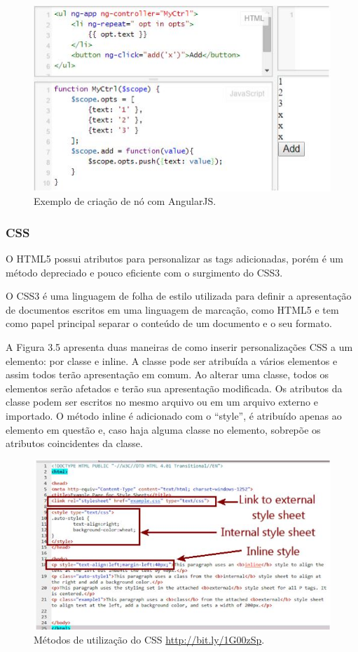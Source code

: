 \documentclass[
  12pt,				%
  openany,
  oneside,
  a4paper,			%
  english,			%
  brazil
]{article}
\numberwithin{figure}{section}
\numberwithin{table}{section}
\begin{document}
\begin{figure}[!htb]
\centering
\includegraphics[width=1\textwidth]{figura34}
\caption{Exemplo de criação de nó com AngularJS.}
\end{figure}

\subsubsection{CSS}

O HTML5 possui atributos para personalizar as tags adicionadas, porém é um método depreciado e pouco eficiente com o surgimento do CSS3.

O CSS3 é uma linguagem de folha de estilo utilizada para definir a apresentação de documentos escritos em uma linguagem de marcação, como HTML5 e tem como papel principal separar o conteúdo de um documento e o seu formato.

A Figura 3.5 apresenta duas maneiras de como inserir personalizações CSS a um elemento: por classe e inline. A classe pode ser atribuída a vários elementos e assim todos terão apresentação em comum. Ao alterar uma classe, todos os elementos serão afetados e terão sua apresentação modificada. Os atributos da classe podem ser escritos no mesmo arquivo ou em um arquivo externo e importado. O método inline é adicionado com o “style”, é atribuído apenas ao elemento em questão e, caso haja alguma classe no elemento, sobrepõe os atributos coincidentes da classe.

\begin{figure}[!htb]
\centering
\includegraphics[width=1\textwidth]{figura35}
\caption{Métodos de utilização do CSS \url{http://bit.ly/1G00zSp}.}
\end{figure}
\end{document}
